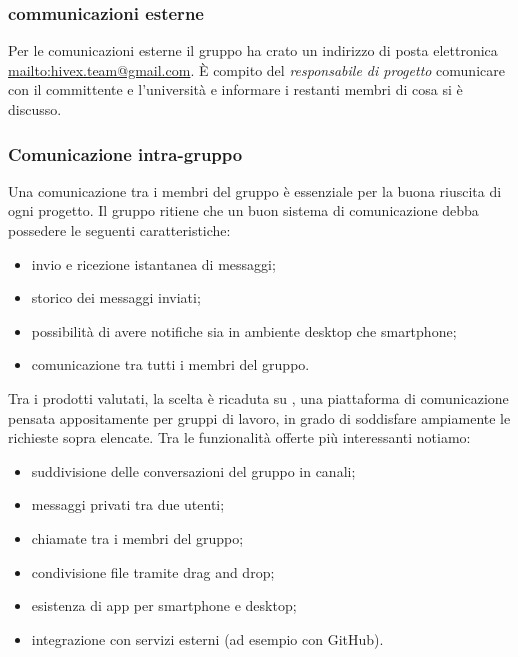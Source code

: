 		\subsubsection{communicazioni esterne}
			Per le comunicazioni esterne il gruppo ha crato un indirizzo di posta elettronica \url{mailto:hivex.team@gmail.com}.
			È compito del \textit{responsabile di progetto} comunicare con il committente e l'università e informare i restanti membri di cosa si è discusso. %
		\subsubsection{Comunicazione intra-gruppo} 
			Una comunicazione tra i membri del gruppo è essenziale per la buona riuscita di ogni progetto. Il gruppo ritiene che un buon sistema di comunicazione debba possedere le seguenti caratteristiche:
			\begin{itemize}
				\item invio e ricezione istantanea di messaggi;
				\item storico dei messaggi inviati;
				\item possibilità di avere notifiche  sia in ambiente desktop che smartphone;
				\item comunicazione tra tutti i membri del gruppo.
			\end{itemize}
			Tra i prodotti valutati, la scelta è ricaduta su , una piattaforma di comunicazione pensata appositamente per gruppi di lavoro, in grado di soddisfare ampiamente le richieste sopra elencate. Tra le funzionalità offerte più interessanti notiamo:
			\begin{itemize}
				\item suddivisione delle conversazioni del gruppo in canali;
				\item messaggi privati tra due utenti;
				\item chiamate tra i membri del gruppo; 
				\item condivisione file tramite drag and drop;
				\item esistenza di app per smartphone e desktop;
				\item integrazione con servizi esterni (ad esempio con GitHub).
			\end{itemize}
